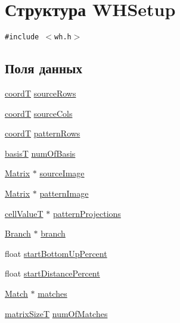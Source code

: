 \hypertarget{struct_w_h_setup}{
\section{Структура WHSetup}
\label{struct_w_h_setup}
}
{\tt \#include $<$wh.h$>$}

\subsection*{Поля данных}
\begin{CompactItemize}
\item 
\hyperlink{walsh__hadamard__run_2pm_2whimport_8h_f75219364b309824eef21d65e9edc43d}{coordT} \hyperlink{struct_w_h_setup_d54de1e0cef8bd64fb69b1e370e4fbdc}{sourceRows}
\item 
\hyperlink{walsh__hadamard__run_2pm_2whimport_8h_f75219364b309824eef21d65e9edc43d}{coordT} \hyperlink{struct_w_h_setup_8159bb556441ae7837ab542835a857a7}{sourceCols}
\item 
\hyperlink{walsh__hadamard__run_2pm_2whimport_8h_f75219364b309824eef21d65e9edc43d}{coordT} \hyperlink{struct_w_h_setup_53049af7b7b6b0ece05c8815dd9b96d1}{patternRows}
\item 
\hyperlink{walsh__hadamard__run_2pm_2whimport_8h_e75f61aaa63d0b7478b8fc8f4f8a15cb}{basisT} \hyperlink{struct_w_h_setup_f77e9027cf9c402e8ab60fad370acd39}{numOfBasis}
\item 
\hyperlink{struct_matrix}{Matrix} $\ast$ \hyperlink{struct_w_h_setup_d6f1b6fadb5c22745c10df2fdcd466f9}{sourceImage}
\item 
\hyperlink{struct_matrix}{Matrix} $\ast$ \hyperlink{struct_w_h_setup_2560e4e508feab69e07fc4298889ed39}{patternImage}
\item 
\hyperlink{walsh__hadamard__run_2pm_2whimport_8h_6a63c2ffcfd00315baff593b8895f32a}{cellValueT} $\ast$ \hyperlink{struct_w_h_setup_c06e481008f29fdd02c95eec15cf9eee}{patternProjections}
\item 
\hyperlink{struct_branch}{Branch} $\ast$ \hyperlink{struct_w_h_setup_f137dfd1194da79dde80b124941564a2}{branch}
\item 
float \hyperlink{struct_w_h_setup_862a743cf81ffe212002e65275690fd5}{startBottomUpPercent}
\item 
float \hyperlink{struct_w_h_setup_10aec4c3c91906bb2cb318efcabf4b1a}{startDistancePercent}
\item 
\hyperlink{struct_match}{Match} $\ast$ \hyperlink{struct_w_h_setup_52dac046e6fd7f085a22d36b47265b50}{matches}
\item 
\hyperlink{walsh__hadamard__run_2pm_2whimport_8h_7b872890b3a65c758de9e62cdf739754}{matrixSizeT} \hyperlink{struct_w_h_setup_2d046c9d4819efdd8ae8dfbcd57bb819}{numOfMatches}
\end{CompactItemize}


